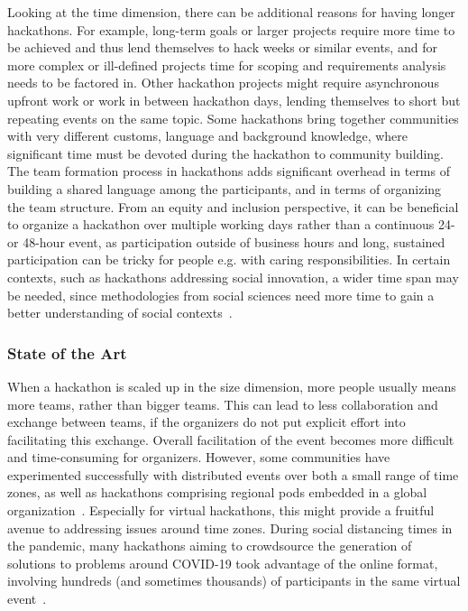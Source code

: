 \documentclass{ieeeaccess}
\begin{document}
Looking at the time dimension, there can be additional reasons for having longer hackathons. 
For example, long-term goals or larger projects require more time to be achieved and thus lend themselves to hack weeks or similar events, and for more complex or ill-defined projects time for scoping and requirements analysis needs to be factored in. 
Other hackathon projects might require asynchronous upfront work or work in between hackathon days, lending themselves to short but repeating events on the same topic. 
Some hackathons bring together communities with very different customs, language and background knowledge, where significant time must be devoted during the hackathon to community building. 
The team formation process in hackathons adds significant overhead in terms of building a shared language among the participants, and in terms of organizing the team structure. 
From an equity and inclusion perspective, it can be beneficial to organize a hackathon over multiple working days rather than a continuous 24- or 48-hour event, as participation outside of business hours and long, sustained participation can be tricky for people e.g. with caring responsibilities. 
In certain contexts, such as hackathons addressing social innovation, a wider time span may be needed, since methodologies from social sciences need more time to gain a better understanding of social contexts~\cite{ferrario2014software}.

\subsubsection{State of the Art}
When a hackathon is scaled up in the size dimension, more people usually means more teams, rather than bigger teams. This can lead to less collaboration and exchange between teams, if the organizers do not put explicit effort into facilitating this exchange. Overall facilitation of the event becomes more difficult and time-consuming for organizers. However, some communities have experimented successfully with distributed events over both a small range of time zones, as well as hackathons comprising regional pods embedded in a global organization~\cite{cameron2016brainhack}. Especially for virtual hackathons, this might provide a fruitful avenue to addressing issues around time zones.  During social distancing times in the pandemic, many hackathons aiming to crowdsource the generation of solutions to problems around COVID-19 took advantage of the online format, involving hundreds (and sometimes thousands) of participants in the same virtual event~\cite{vermicelli2020can,braune2021interdisciplinary}.
\end{document}
